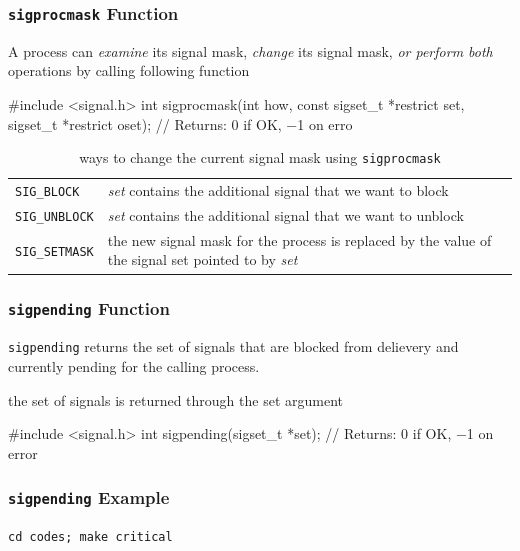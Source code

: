\documentclass[newPxFont,sthlmFooter,nooffset]{beamer}
\begin{document}
\begin{frame}[fragile,t]
  \frametitle{\texttt{sigprocmask} Function}
A process can \textit{examine} its signal mask, \textit{change} its signal mask, \textit{or perform both} operations by calling following function

\begin{codedef}
#include <signal.h>
int sigprocmask(int how, const sigset_t *restrict set, 
                sigset_t *restrict oset);
// Returns: 0 if OK, −1 on erro    
\end{codedef}

\begin{table}[h]
  \centering
  \begin{tabular}{l | p{8cm}}
    \texttt{SIG\_BLOCK} & \textit{set} contains the additional signal that we want to block \\ 
    \texttt{SIG\_UNBLOCK} & \textit{set} contains the additional signal that we want to unblock \\ 
    \texttt{SIG\_SETMASK} & the new signal mask for the process is replaced by the value of the signal set pointed to by \textit{set}
  \end{tabular}
  \caption{ways to change the current signal mask using \texttt{sigprocmask}}
  \label{tab:sigprocmask}
\end{table}

\end{frame}




\begin{frame}[fragile,t]
  \frametitle{\texttt{sigpending} Function}

\texttt{sigpending} returns the set of signals that are blocked from delievery and currently pending for the calling process.

the set of signals is returned through the set argument
\begin{codedef}
#include <signal.h>
int sigpending(sigset_t *set);
// Returns: 0 if OK, −1 on error  
\end{codedef}
\end{frame}




\begin{frame}
  \frametitle{\texttt{sigpending} Example}

\texttt{cd codes; make critical}


\end{frame}
\end{document}
